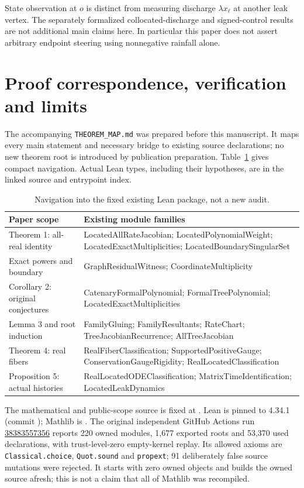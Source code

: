 \documentclass[11pt]{article}
\theoremstyle{remark}
\newcommand{\1}{\mathbf 1}
\begin{document}
State observation at $o$ is distinct from measuring discharge
$\lambda x_\ell$ at another leak vertex. The separately formalized
collocated-discharge and signed-control results are not additional main
claims here. In particular this paper does not assert arbitrary endpoint
steering using nonnegative rainfall alone.

\section{Proof correspondence, verification and limits}
The accompanying \texttt{THEOREM\_MAP.md} was prepared before this manuscript.
It maps every main statement and necessary bridge to existing source
declarations; no new theorem root is introduced by publication preparation.
Table~\ref{tab:map} gives compact navigation. Actual Lean types, including
their hypotheses, are in the linked source and entrypoint index.

\begin{table}[ht]
\centering\small
\begin{tabular}{@{}p{.28\linewidth}p{.66\linewidth}@{}}
\toprule
Paper scope & Existing module families\\
\midrule
Theorem 1: all-real identity & LocatedAllRateJacobian; LocatedPolynomialWeight;
LocatedExactMultiplicities; LocatedBoundarySingularSet\\[3pt]
Exact powers and boundary & GraphResidualWitness; CoordinateMultiplicity\\[3pt]
Corollary 2: original conjectures & CatenaryFormalPolynomial;
FormalTreePolynomial; LocatedExactMultiplicities\\[3pt]
Lemma 3 and root induction & FamilyGluing; FamilyResultants; RateChart;
TreeJacobianRecurrence; AllTreeJacobian\\[3pt]
Theorem 4: real fibers & RealFiberClassification; SupportedPositiveGauge;
ConservationGaugeRigidity; RealLocatedClassification\\[3pt]
Proposition 5: actual histories & RealLocatedODEClassification;
MatrixTimeIdentification; LocatedLeakDynamics\\
\bottomrule
\end{tabular}
\caption{Navigation into the fixed existing Lean package, not a new audit.}
\label{tab:map}
\end{table}

The mathematical and public-scope source is fixed at
.
Lean is pinned to 4.34.1 (commit
); Mathlib is
.
The original independent GitHub Actions run
\href{https://github.com/mxym/math/actions/runs/38383557356}{38383557356}
reports 220 owned modules, 1,677 exported roots and 53,370 used declarations,
with trust-level-zero empty-kernel replay. Its allowed axioms are
\texttt{Classical.choice}, \texttt{Quot.sound} and \texttt{propext};
91 deliberately false source mutations were rejected.
It starts with zero owned objects and builds the owned source afresh;
this is not a claim that all of Mathlib was recompiled.
\end{document}
